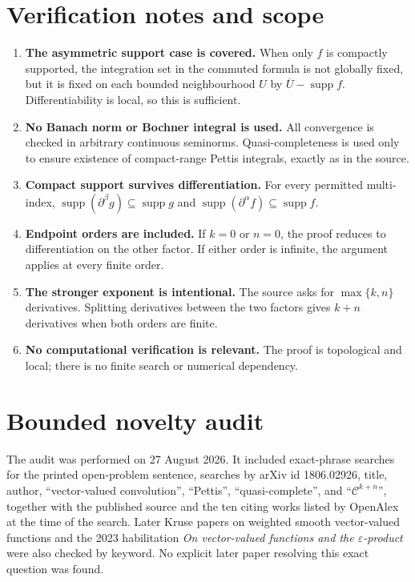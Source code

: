 \documentclass[11pt]{article}
\newcommand{\supp}{\operatorname{supp}}
\newcommand{\C}{\mathcal{C}}
\begin{document}
\section{Verification notes and scope}

\begin{enumerate}[leftmargin=*,itemsep=4pt]
\item \textbf{The asymmetric support case is covered.} When only $f$ is
compactly supported, the integration set in the commuted formula is not
globally fixed, but it is fixed on each bounded neighbourhood $U$ by
$\overline U-\supp f$. Differentiability is local, so this is sufficient.

\item \textbf{No Banach norm or Bochner integral is used.} All convergence is
checked in arbitrary continuous seminorms. Quasi-completeness is used only to
ensure existence of compact-range Pettis integrals, exactly as in the source.

\item \textbf{Compact support survives differentiation.} For every permitted
multi-index, $\supp(\partial^\beta g)\subseteq\supp g$ and
$\supp(\partial^\alpha f)\subseteq\supp f$.

\item \textbf{Endpoint orders are included.} If $k=0$ or $n=0$, the proof
reduces to differentiation on the other factor. If either order is infinite,
the argument applies at every finite order.

\item \textbf{The stronger exponent is intentional.} The source asks for
$\max\{k,n\}$ derivatives. Splitting derivatives between the two factors
gives $k+n$ derivatives when both orders are finite.

\item \textbf{No computational verification is relevant.} The proof is
topological and local; there is no finite search or numerical dependency.
\end{enumerate}

\section{Bounded novelty audit}

The audit was performed on 27 August 2026. It included exact-phrase searches
for the printed open-problem sentence, searches by arXiv id 1806.02926, title,
author, ``vector-valued convolution'', ``Pettis'', ``quasi-complete'', and
``$\C^{k+n}$'', together with the published source and the ten citing works
listed by OpenAlex at the time of the search. Later Kruse papers on weighted
smooth vector-valued functions and the 2023 habilitation
\emph{On vector-valued functions and the $\varepsilon$-product} were also
checked by keyword. No explicit later paper resolving this exact question was
found.
\end{document}
